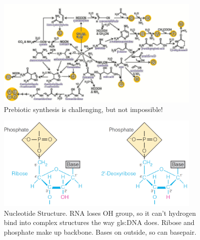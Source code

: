 \documentclass[]{article}
\begin{document}
\begin{figure}[H]
	\caption{Prebiotic synthesis is challenging, but not impossible!}\label{fig:PrebioticSynthesis} 
	\includegraphics[width=0.9\textwidth]{PrebioticSynthesis}
\end{figure}

\begin{figure}[H]
	\caption{Nucleotide Structure. RNA loses OH group, so it can't hydrogen bind into complex structures the way \gls{gls:DNA} does. Ribose and phosphate make up backbone. Bases on outside, so can basepair.}\label{fig:NucleotideStructure} 
	\includegraphics[width=0.9\textwidth]{NucleotideStructure}
\end{figure}
\end{document}
